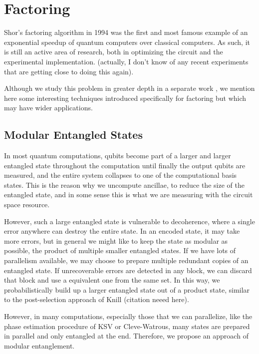 \section{Factoring}
\label{sec:factor}

Shor's factoring algorithm in 1994 was the first and most famous example of an
exponential speedup of quantum computers over classical computers.
\cite{Shor1994}
As such, it is still an active area of research, both in optimizing the
circuit \cite{Cleve2002} and the experimental implementation. (actually,
I don't know of any
recent experiments that are getting close to doing this again).

Although we study this problem in greater depth in a separate work
\cite{Pham2012b}, we mention here some interesting techniques introduced
specifically for factoring but which may have wider applications.

\subsection{Modular Entangled States}

In most quantum computations, qubits become part of a larger and larger
entangled state throughout the computation until finally the output
qubits are measured, and the entire system collapses to one of the
computational basis states. This is the reason why we uncompute ancillae,
to reduce the size of the entangled state, and in some sense this is what
we are measuring with the circuit space resource.

However, such a large entangled state is vulnerable to decoherence, where
a single error anywhere can destroy the entire state. In an encoded state,
it may take more errors, but in general we might like to keep the
state as modular as possible, the product of multiple smaller entangled
states. If we have lots of parallelism available, we may choose to
prepare multiple redundant copies of an entangled state.
If unrecoverable errors are detected in any block, we can discard
that block and use a equivalent one from the same set.
In this way, we probabilistically build up a larger entangled state out of
a product state, similar to the post-selection approach of Knill
(citation neeed here).

However, in many computations, especially those that we can parallelize,
like the phase estimation procedure of KSV or Cleve-Watrous,
many states are prepared in parallel and only entangled at the end.
Therefore, we propose an approach of modular entanglement.


